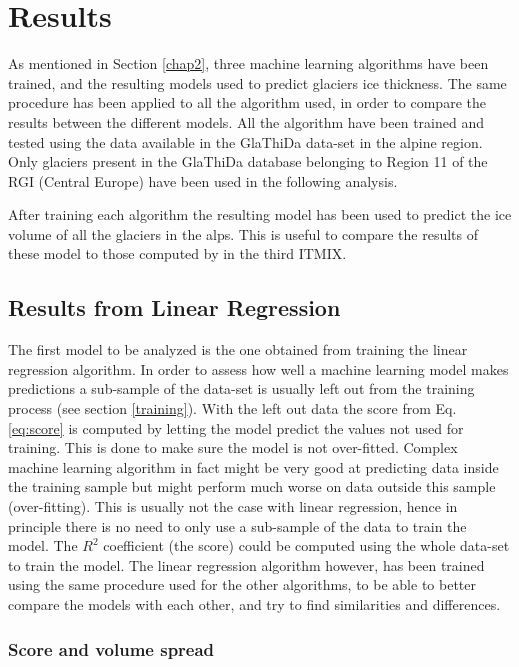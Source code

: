 \chapter{Results}\label{chap3}
\thispagestyle{plain}

As mentioned in Section \ref{chap2}, three machine learning algorithms have been trained, and the resulting models used to predict glaciers ice thickness. The same procedure has been applied to all the algorithm used, in order to compare the results between the different models. 
All the algorithm have been trained and tested using the data available in the GlaThiDa data-set in the alpine region. Only glaciers present in the GlaThiDa database belonging to Region 11 of the RGI (Central Europe) have been used in the following analysis.

After training each algorithm the resulting model has been used to predict the ice volume of all the glaciers in the alps. This is useful to compare the results of these model to those computed by \citet{Farinotti2019} in the third ITMIX.

\section{Results from Linear Regression}\label{linear}
The first model to be analyzed is the one obtained from training the linear regression algorithm. In order to assess how well a machine learning model makes predictions a sub-sample of the data-set is usually left out from the training process (see section \ref{training}). With the left out data the score from Eq. \ref{eq:score} is computed by letting the model predict the values not used for training. This is done to make sure the model is not over-fitted. Complex machine learning algorithm in fact might be very good at predicting data inside the training sample but might perform much worse on data outside this sample (over-fitting). 
This is usually not the case with linear regression, hence in principle there is no need to only use a sub-sample of the data to train the model. The $R^2$ coefficient (the score) could be computed using the whole data-set to train the model. The linear regression algorithm however, has been trained using the same procedure used for the other algorithms, to be able to better compare the models with each other, and try to find similarities and differences.     

\subsection{Score and volume spread}\label{lr-score}

